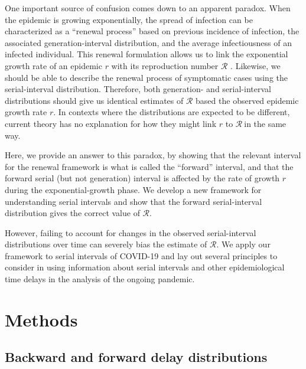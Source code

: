 \documentclass[12pt]{article}
\newcommand{\comment}{\nocomment}
\newcommand{\nocomment}[3]{}
\newcommand{\jd}[1]{\comment{cyan}{JD}{#1}}
\newcommand{\Rx}[1]{\ensuremath{{\mathcal R}_{#1}}}
\begin{document}
One important source of confusion comes down to an apparent paradox.
When the epidemic is growing exponentially, the spread of infection can be characterized as a ``renewal process'' based on previous incidence of infection, the associated generation-interval distribution, and the average infectiousness of an infected individual.
This renewal formulation allows us to link the exponential growth rate of an epidemic $r$ with its reproduction number $\mathcal R$ \citep{wallinga2007generation}.
Likewise, we should be able to describe the renewal process of symptomatic cases using the serial-interval distribution.
Therefore, both generation- and serial-interval distributions should give us identical estimates of  $\mathcal R$ based the observed epidemic growth rate $r$.
In contexts where the distributions are expected to be different, current theory has no explanation for how they might link $r$ to \Rx\ in the same way.

Here, we provide an answer to this paradox, by showing that the relevant interval for the renewal framework is what is called the ``forward'' interval, and that the forward serial (but not generation) interval is affected by the rate of growth $r$ during the exponential-growth phase.
We develop a new framework for understanding serial intervals and show that the forward serial-interval distribution gives the correct value of $\mathcal R$.
\jd{Come back to this. Not just over time, right?}
However, failing to account for changes in the observed serial-interval distributions over time can severely bias the estimate of $\mathcal R$.
We apply our framework to serial intervals of COVID-19 and lay out several principles to consider in using information about serial intervals and other epidemiological time delays in the analysis of the ongoing pandemic.

\section{Methods}

\subsection{Backward and forward delay distributions}
\end{document}
